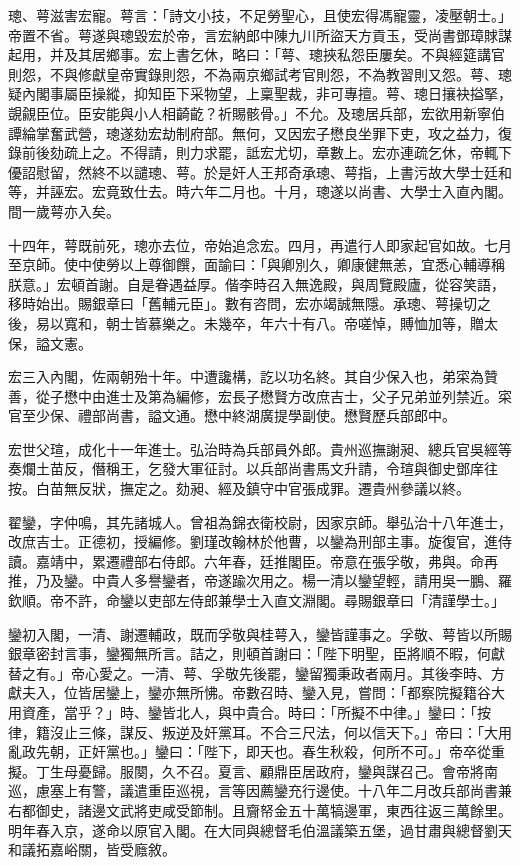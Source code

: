 \begin{pinyinscope}
璁、萼滋害宏寵。萼言：「詩文小技，不足勞聖心，且使宏得馮寵靈，凌壓朝士。」帝置不省。萼遂與璁毀宏於帝，言宏納郎中陳九川所盜天方貢玉，受尚書鄧璋賕謀起用，并及其居鄉事。宏上書乞休，略曰：「萼、璁挾私怨臣屢矣。不與經筵講官則怨，不與修獻皇帝實錄則怨，不為兩京鄉試考官則怨，不為教習則又怨。萼、璁疑內閣事屬臣操縱，抑知臣下采物望，上稟聖裁，非可專擅。萼、璁日攘袂搤掔，覬覦臣位。臣安能與小人相齮齕？祈賜骸骨。」不允。及璁居兵部，宏欲用新寧伯譚綸掌奮武營，璁遂劾宏劫制府部。無何，又因宏子懋良坐罪下吏，攻之益力，復錄前後劾疏上之。不得請，則力求罷，詆宏尤切，章數上。宏亦連疏乞休，帝輒下優詔慰留，然終不以譴璁、萼。於是奸人王邦奇承璁、萼指，上書污故大學士廷和等，并誣宏。宏竟致仕去。時六年二月也。十月，璁遂以尚書、大學士入直內閣。間一歲萼亦入矣。

十四年，萼既前死，璁亦去位，帝始追念宏。四月，再遣行人即家起官如故。七月至京師。使中使勞以上尊御饌，面諭曰：「與卿別久，卿康健無恙，宜悉心輔導稱朕意。」宏頓首謝。自是眷遇益厚。偕李時召入無逸殿，與周覽殿廬，從容笑語，移時始出。賜銀章曰「舊輔元臣」。數有咨問，宏亦竭誠無隱。承璁、萼操切之後，易以寬和，朝士皆慕樂之。未幾卒，年六十有八。帝嗟悼，賻恤加等，贈太保，謚文憲。

宏三入內閣，佐兩朝殆十年。中遭讒構，訖以功名終。其自少保入也，弟寀為贊善，從子懋中由進士及第為編修，宏長子懋賢方改庶吉士，父子兄弟並列禁近。寀官至少保、禮部尚書，謚文通。懋中終湖廣提學副使。懋賢歷兵部郎中。

宏世父瑄，成化十一年進士。弘治時為兵部員外郎。貴州巡撫謝昶、總兵官吳經等奏爛土苗反，僭稱王，乞發大軍征討。以兵部尚書馬文升請，令瑄與御史鄧庠往按。白苗無反狀，撫定之。劾昶、經及鎮守中官張成罪。遷貴州參議以終。

翟鑾，字仲鳴，其先諸城人。曾祖為錦衣衛校尉，因家京師。舉弘治十八年進士，改庶吉士。正德初，授編修。劉瑾改翰林於他曹，以鑾為刑部主事。旋復官，進侍讀。嘉靖中，累遷禮部右侍郎。六年春，廷推閣臣。帝意在張孚敬，弗與。命再推，乃及鑾。中貴人多譽鑾者，帝遂踰次用之。楊一清以鑾望輕，請用吳一鵬、羅欽順。帝不許，命鑾以吏部左侍郎兼學士入直文淵閣。尋賜銀章曰「清謹學士。」

鑾初入閣，一清、謝遷輔政，既而孚敬與桂萼入，鑾皆謹事之。孚敬、萼皆以所賜銀章密封言事，鑾獨無所言。詰之，則頓首謝曰：「陛下明聖，臣將順不暇，何獻替之有。」帝心愛之。一清、萼、孚敬先後罷，鑾留獨秉政者兩月。其後李時、方獻夫入，位皆居鑾上，鑾亦無所怫。帝數召時、鑾入見，嘗問：「都察院擬籍谷大用資產，當乎？」時、鑾皆北人，與中貴合。時曰：「所擬不中律。」鑾曰：「按律，籍沒止三條，謀反、叛逆及奸黨耳。不合三尺法，何以信天下。」帝曰：「大用亂政先朝，正奸黨也。」鑾曰：「陛下，即天也。春生秋殺，何所不可。」帝卒從重擬。丁生母憂歸。服闋，久不召。夏言、顧鼎臣居政府，鑾與謀召己。會帝將南巡，慮塞上有警，議遣重臣巡視，言等因薦鑾充行邊使。十八年二月改兵部尚書兼右都御史，諸邊文武將吏咸受節制。且齎帑金五十萬犒邊軍，東西往返三萬餘里。明年春入京，遂命以原官入閣。在大同與總督毛伯溫議築五堡，過甘肅與總督劉天和議拓嘉峪關，皆受廕敘。


\end{pinyinscope}
